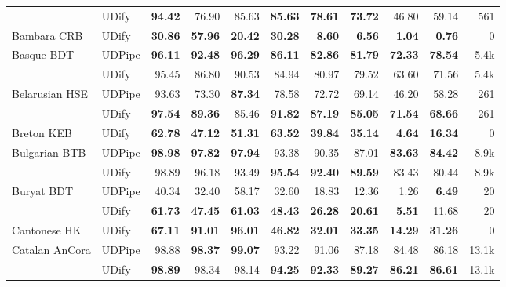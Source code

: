 \documentclass[11pt,a4paper]{article}
\begin{document}
\begin{table*}
\begin{center}
\begin{tabular}{@{}llrrrrrrrrr@{}}
               & UDify &  \bf 94.42 &      76.90 &       85.63 &  \bf 85.63 &  \bf 78.61 &  \bf 73.72 &      46.80 &      59.14 &    561 \\
    \addlinespace
    Bambara CRB & UDify &  \bf 30.86 &  \bf 57.96 &   \bf 20.42 &  \bf 30.28 &   \bf 8.60 &   \bf 6.56 &   \bf 1.04 &   \bf 0.76 &      0 \\
    \addlinespace
    Basque BDT & UDPipe &  \bf 96.11 &  \bf 92.48 &   \bf 96.29 &  \bf 86.11 &  \bf 82.86 &  \bf 81.79 &  \bf 72.33 &  \bf 78.54 &   5.4k \\
               & UDify &      95.45 &      86.80 &       90.53 &      84.94 &      80.97 &      79.52 &      63.60 &      71.56 &   5.4k \\
    \addlinespace
    Belarusian HSE & UDPipe &      93.63 &      73.30 &   \bf 87.34 &      78.58 &      72.72 &      69.14 &      46.20 &      58.28 &    261 \\
               & UDify &  \bf 97.54 &  \bf 89.36 &       85.46 &  \bf 91.82 &  \bf 87.19 &  \bf 85.05 &  \bf 71.54 &  \bf 68.66 &    261 \\
    \addlinespace
    Breton KEB & UDify &  \bf 62.78 &  \bf 47.12 &   \bf 51.31 &  \bf 63.52 &  \bf 39.84 &  \bf 35.14 &   \bf 4.64 &  \bf 16.34 &      0 \\
    \addlinespace
    Bulgarian BTB & UDPipe &  \bf 98.98 &  \bf 97.82 &   \bf 97.94 &      93.38 &      90.35 &      87.01 &  \bf 83.63 &  \bf 84.42 &   8.9k \\
               & UDify &      98.89 &      96.18 &       93.49 &  \bf 95.54 &  \bf 92.40 &  \bf 89.59 &      83.43 &      80.44 &   8.9k \\
    \addlinespace
    Buryat BDT & UDPipe &      40.34 &      32.40 &       58.17 &      32.60 &      18.83 &      12.36 &       1.26 &   \bf 6.49 &     20 \\
               & UDify &  \bf 61.73 &  \bf 47.45 &   \bf 61.03 &  \bf 48.43 &  \bf 26.28 &  \bf 20.61 &   \bf 5.51 &      11.68 &     20 \\
    \addlinespace
    Cantonese HK & UDify &  \bf 67.11 &  \bf 91.01 &   \bf 96.01 &  \bf 46.82 &  \bf 32.01 &  \bf 33.35 &  \bf 14.29 &  \bf 31.26 &      0 \\
    \addlinespace
    Catalan AnCora & UDPipe &      98.88 &  \bf 98.37 &   \bf 99.07 &      93.22 &      91.06 &      87.18 &      84.48 &      86.18 &  13.1k \\
           & UDify &  \bf 98.89 &      98.34 &       98.14 &  \bf 94.25 &  \bf 92.33 &  \bf 89.27 &  \bf 86.21 &  \bf 86.61 &  13.1k \\

\end{tabular}
\end{center}
\end{table*}
\end{document}
